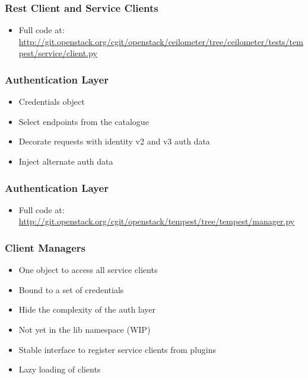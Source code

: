 \documentclass[aspectratio=169,11pt,hyperref={colorlinks=true}]{beamer}
\begin{document}
\begin{frame}
    \frametitle{Rest Client and Service Clients}
    
    \begin{itemize}
        \item \tiny Full code at: \href{http://git.openstack.org/cgit/openstack/ceilometer/tree/ceilometer/tests/tempest/service/client.py}{http://git.openstack.org/cgit/openstack/ceilometer/tree/ceilometer/tests/tempest/service/client.py}
    \end{itemize}
\end{frame}

\begin{frame}
    \frametitle{Authentication Layer}
    \begin{itemize}
        \item Credentials object
        \item Select endpoints from the catalogue
        \item Decorate requests with identity v2 and v3 auth data
        \item Inject alternate auth data
    \end{itemize}
\end{frame}

\begin{frame}
    \frametitle{Authentication Layer}
    
    \begin{itemize}
        \item \tiny Full code at: \href{http://git.openstack.org/cgit/openstack/tempest/tree/tempest/manager.py}{http://git.openstack.org/cgit/openstack/tempest/tree/tempest/manager.py}
    \end{itemize}
\end{frame}

\begin{frame}
    \frametitle{Client Managers}
    \begin{itemize}
        \item One object to access all service clients
        \item Bound to a set of credentials
        \item Hide the complexity of the auth layer
        \item Not yet in the lib namespace (WIP)
    \end{itemize}
    \begin{itemize}
        \item Stable interface to register service clients from plugins
        \item Lazy loading of clients
    \end{itemize}
\end{frame}
\end{document}
